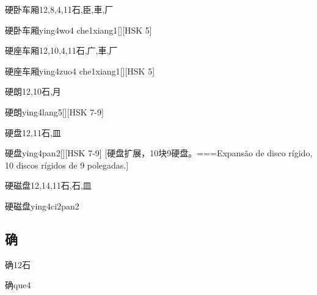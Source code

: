 \begin{Entry}{硬卧车厢}{12,8,4,11}{⽯,⾂,⾞,⼚}
  \begin{Phonetics}{硬卧车厢}{ying4wo4 che1xiang1}[][HSK 5]
  \end{Phonetics}
\end{Entry}

\begin{Entry}{硬座车厢}{12,10,4,11}{⽯,⼴,⾞,⼚}
  \begin{Phonetics}{硬座车厢}{ying4zuo4 che1xiang1}[][HSK 5]
  \end{Phonetics}
\end{Entry}

\begin{Entry}{硬朗}{12,10}{⽯,⽉}
  \begin{Phonetics}{硬朗}{ying4lang5}[][HSK 7-9]
  \end{Phonetics}
\end{Entry}

\begin{Entry}{硬盘}{12,11}{⽯,⽫}
  \begin{Phonetics}{硬盘}{ying4pan2}[][HSK 7-9]
    [硬盘扩展，10块9硬盘。===Expansão de disco rígido, 10 discos rígidos de 9 polegadas.]
  \end{Phonetics}
\end{Entry}

\begin{Entry}{硬磁盘}{12,14,11}{⽯,⽯,⽫}
  \begin{Phonetics}{硬磁盘}{ying4ci2pan2}
  \end{Phonetics}
\end{Entry}

\subsection*{确}

\begin{Entry}{确}{12}{⽯}
  \begin{Phonetics}{确}{que4}
  \end{Phonetics}
\end{Entry}

